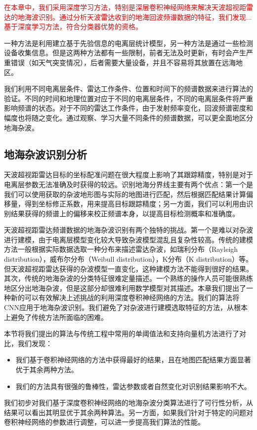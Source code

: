 \textcolor{red}{在本章中，我们采用深度学习方法，特别是深层卷积神经网络来解决天波超视距雷达的地海波识别。通过分析天波雷达收到的地海回波频谱数据的特征，我们发现...基于深度学习方法，符合分类器优势的资格。}

一种方法是利用建立基于先验信息的电离层统计模型，另一种方法是通过一些检测设备收集信息。但是这两种方法都有一些限制，前者无法及时更新，有时会产生严重错误（如天气突变情况），后者需要大量设备，并且不容易将其放置在远海地区。

我们利用不同电离层条件、雷达工作条件、位置和时间下的频谱数据来进行算法的验证。不同的时间和地理位置对应于不同的电离层条件，不同的电离层条件将严重影响频谱的状态。对于不同的雷达工作条件，由于发射频率变化，回波频谱密度和幅度也将随之变化。通过观察、学习大量不同条件的频谱数据，可以更全面地区分地海杂波。

\subsection{地海杂波识别分析}
天波超视距雷达目标的坐标配准问题在很大程度上影响了其跟踪精度，特别是对于电离层参数无法准确及时获得的较远。识别地海分界线主要有两个优点：第一个是我们可以使用获取的杂波地形图与实际的地图进行匹配，然后根据匹配结果计算偏移量，得到坐标修正系数，用来提高目标跟踪精度；另一方面，我们可以利用由识别结果获得的频谱上的偏移来校正频谱本身，以提高目标检测概率和准确度。

天波超视距雷达频谱数据的地海杂波识别有两个独特的挑战。第一个是难以对杂波进行建模，由于电离层模型变化较大导致杂波模型混乱且复杂性较高。传统的建模方法一般根据实际数据选取一种分布来描述雷达杂波，如瑞利分布（Rayleigh distribution），威布尔分布（Weibull distribution），K分布（K distribution）等。但天波超视距雷达获得的杂波模型一直变化，这种建模方法不能得到很好的结果。其次，传统的地海杂波的分类特征很难定量描述。一个熟练的操作人员可能很熟练地区分出地海杂波，但是这部分却很难利用数学模型对其描述。本章我们提出了一种新的可以有效解决上述挑战的利用深度卷积神经网络的方法。我们的算法将CNN应用于地海杂波识别。我们避免了对杂波进行建模选取特征的方法，从根本上避免了传统方法所面临的困难。

本节将我们提出的算法与传统工程中常用的单阈值法和支持向量机方法进行了对比，我们发现：
\begin{itemize}
	\item 我们基于卷积神经网络的方法中获得最好的结果，且在地图匹配结果方面显著优于其余两种方法。
	\item 我们的方法具有很强的鲁棒性，雷达参数或者自然变化对识别结果影响不大。
\end{itemize}
我们初步对我们基于深度卷积神经网络的地海杂波分类算法进行了可行性分析，从结果可以看出其明显优于其余两种算法。另一方面，如果我们针对于特定的问题对卷积神经网络的参数进行调整，可以进一步提高我们算法的性能。
